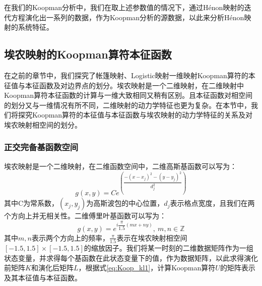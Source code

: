 在我们的Koopman分析中，我们在取上述参数值的情况下，通过H\'{e}non映射的迭代方程演化出一系列的数据，作为Koopman分析的源数据，以此来分析H\'{e}non映射的系统特征。


\subsection{埃农映射的Koopman算符本征函数}
在之前的章节中，我们探究了帐篷映射、Logistic映射一维映射Koopman算符的本征值与本征函数及对边界点的划分。埃农映射是一个二维映射，在二维映射中Koopman算符本征函数的计算与一维大致相同又稍有区别。且本征函数对相空间的划分又与一维情况有所不同，二维映射的动力学特征也更为复杂。在本节中，我们将探究Koopman算符的本征值与本征函数与埃农映射的动力学特征的关系及对埃农映射相空间的划分。


\subsubsection{正交完备基函数空间}
埃农映射是一个二维映射，在二维函数空间中，二维高斯基函数可以写为：
\begin{equation}
  g(x,y)=Ce^{({\dfrac{-(x-x_j)^2-(y-y_j)^2}{d_j^2}})}
\end{equation}
其中C为常系数，$(x_j,y_j)$为高斯波包的中心位置，$d_j$表示格点宽度，且我们在两个方向上并无相关性。二维傅里叶基函数可以写为：
\begin{equation}
  g(x,y)=e^{i\dfrac{\pi}{1.5}(mx+ny)},\ m,n\in\mathbb{Z}
\end{equation}
其中$m,n$表示两个方向上的频率，$\frac{\pi}{1.5}$表示在埃农映射相空间$[-1.5,1.5]\times [-1.5,1.5]$的缩放因子。我们将某一时刻的二维数据矩阵作为一组状态变量，并求得每个基函数在此状态变量下的值，作为数据矩阵，以此求得演化前矩阵$K$和演化后矩阵$L$，根据式\eqref{eq:Koop_kl1}，计算Koopman算符$U$的矩阵表示及其本征值与本征函数。

